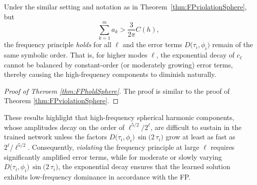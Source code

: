 \documentclass[review,onefignum,onetabnum,onealgnum]{siamart250106}
\numberwithin{theorem}{section}
\begin{document}
\begin{theorem}
\label{thm:FPholdSphere}
Under the similar setting and notation as in Theorem~\ref{thm:FPviolationSphere}, but$$
\sum_{k=1}^m a_k > \frac{3}{2\pi}C(h),$$
the frequency principle \emph{holds} for all \(\ell\) and the error terms \(D\bigl(\tau_i,\phi_i\bigr)\) remain of the same symbolic order.  
That is, for higher modes \(\ell\), the exponential decay of \(c_{\ell}\) cannot be balanced by constant-order (or moderately 
growing) error terms, thereby causing the high-frequency components to diminish naturally.
\end{theorem}
\begin{proof}[Proof of Theroem \ref{thm:FPholdSphere}]
    The proof is similar to the proof of Theorem \ref{thm:FPviolationSphere}.
\end{proof}
\begin{remark}
These results highlight that high-frequency spherical harmonic components, whose amplitudes decay on the order of 
\(\ell^{5/2}/2^\ell\), are difficult to sustain in the trained network unless the factors 
\(D\bigl(\tau_i,\phi_i\bigr)\,\sin\bigl(2\,\tau_i\bigr)\) grow at least as fast as \(2^\ell / \ell^{5/2}\). 
Consequently, \emph{violating} the frequency principle at large \(\ell\) requires significantly amplified error terms, while 
for moderate or slowly varying \(D\bigl(\tau_i,\phi_i\bigr)\,\sin\bigl(2\,\tau_i\bigr)\), the exponential decay ensures 
that the learned solution exhibits low-frequency dominance in accordance with the FP.
\end{remark}
\end{document}
